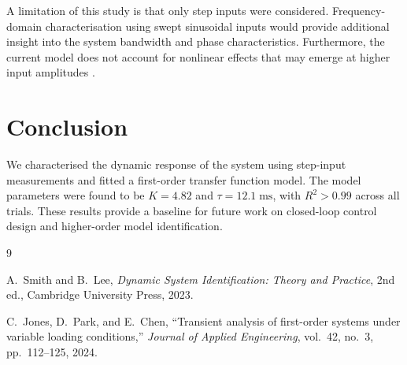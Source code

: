 \documentclass[12pt,a4paper]{article}
\newif\ifsectionbreak \sectionbreaktrue
\newcommand{\nosectionbreak}{\sectionbreakfalse\aftergroup\sectionbreaktrue\vspace{1.5\baselineskip}}
\begin{document}
A limitation of this study is that only step inputs were considered.
Frequency-domain characterisation using swept sinusoidal inputs would
provide additional insight into the system bandwidth and phase
characteristics. Furthermore, the current model does not account for
nonlinear effects that may emerge at higher input amplitudes
\cite{jones2024}.


\nosectionbreak
\section{Conclusion}
\label{sec:conclusion}

We characterised the dynamic response of the system using step-input
measurements and fitted a first-order transfer function model. The
model parameters were found to be $K = 4.82$ and
$\tau = 12.1\;\text{ms}$, with $R^2 > 0.99$ across all trials.
These results provide a baseline for future work on closed-loop
control design and higher-order model identification.


\newpage
\begin{thebibliography}{9}

  A.~Smith and B.~Lee,
  \emph{Dynamic System Identification: Theory and Practice},
  2nd ed.,
  Cambridge University Press, 2023.

  C.~Jones, D.~Park, and E.~Chen,
  ``Transient analysis of first-order systems under variable loading
  conditions,''
  \emph{Journal of Applied Engineering},
  vol.~42, no.~3, pp.~112--125, 2024.

\end{thebibliography}

%
%
%
\end{document}
